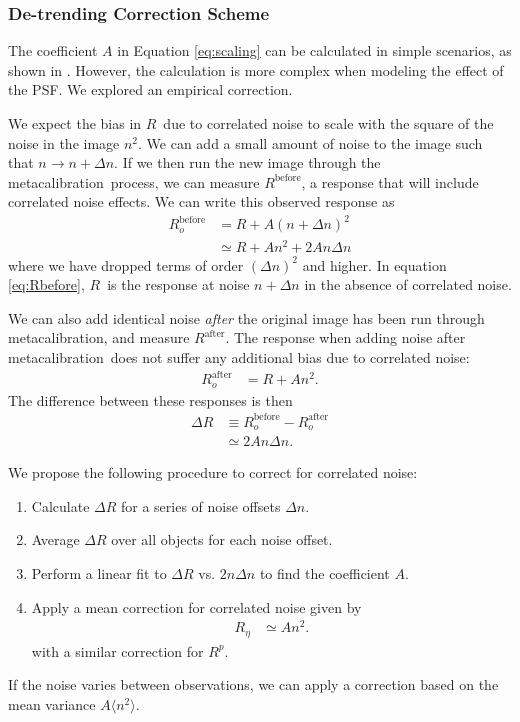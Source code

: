 \documentclass[a4paper,fleqn,usenatbib]{mnras}
\newcommand{\mcal}{metacalibration}
\newcommand{\mcalR}{$R$}
\newcommand{\mcalRpsf}{$R^{p}$}
\newcommand{\mcalRnoise}{$R_\eta$}
\begin{document}
\subsubsection{De-trending Correction Scheme}

The coefficient $A$ in Equation \ref{eq:scaling} can be calculated in simple
scenarios, as shown in \cite{HirataCorrNoise}.  However, the calculation is
more complex when modeling the effect of the PSF.  We explored an empirical
correction.

We expect the bias in \mcalR\ due to correlated noise to scale with the square
of the noise in the image $n^2$.  We can add a small
amount of noise to the image such that $n \rightarrow n + \Delta n$.  If we
then run the new image through the \mcal\ process, we can measure
$R^{\mathrm{before}}$, a response that will include correlated noise effects.
We can write this observed response as
\begin{align}\label{eq:Rbefore}
    R_o^{\mathrm{before}} &= R + A (n + \Delta n)^2 \nonumber \\
       &\simeq R + A n^2 + 2 A n \Delta n
\end{align}
where we have dropped terms of order $(\Delta n)^2$ and higher.  In equation
\ref{eq:Rbefore}, \mcalR\ is the response at noise $n+\Delta n$ in the absence
of correlated noise.  

We can also add identical noise {\em after} the original image  has been run
through \mcal, and measure $R^{\mathrm{after}}$.  The response when adding
noise after \mcal\ does not suffer any additional bias due to correlated noise:
\begin{align}
    R_o^{\mathrm{after}} &= R + A n^2.
\end{align}
The difference between these responses is then 
\begin{align}
    \Delta R &\equiv R_o^{\mathrm{before}} - R_o^{\mathrm{after}}  \nonumber \\
             &\simeq 2 A n \Delta n.
\end{align}

We propose the following procedure to correct for correlated noise:
\begin{enumerate}
    \item Calculate $\Delta R$ for a series of noise offsets $\Delta n$.
    \item Average $\Delta R$ over all objects for each noise offset.
    \item Perform a linear fit to $\Delta R$ vs. $2 n \Delta n$ to find the 
        coefficient $A$.
    \item Apply a mean correction for correlated noise given by
        \begin{align}
            \mbox{\mcalRnoise} & \simeq A n^2.
        \end{align}
        with a similar correction for \mcalRpsf.
\end{enumerate}
If the noise varies between observations, we can apply a 
correction based on the mean variance $A
\langle n^2 \rangle$.
\end{document}
